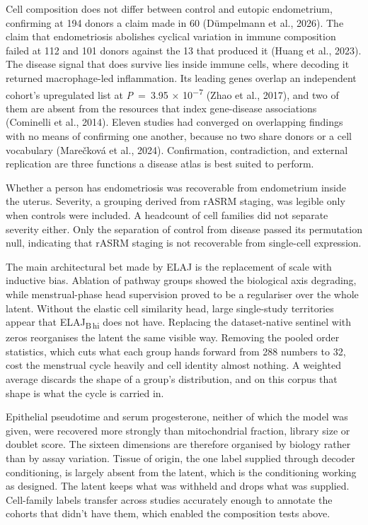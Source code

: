 \documentclass[11pt]{article}
\newcommand{\elaj}{ELAJ\xspace}
\begin{document}
Cell composition does not differ between control and eutopic endometrium,
confirming at 194 donors a claim made in 60
(Dümpelmann et al., 2026). The claim that endometriosis abolishes
cyclical variation in immune composition failed at 112 and 101 donors against
the 13 that produced it (Huang et al., 2023). The disease signal that does
survive lies inside immune cells, where decoding it returned macrophage-led
inflammation. Its leading genes overlap an independent cohort's upregulated
list at \textit{P}~=~3.95 × 10\textsuperscript{−7}
(Zhao et al., 2017), and two of them are absent from the resources
that index gene-disease associations (Cominelli et al., 2014). Eleven
studies had converged on overlapping findings with no means of confirming one
another, because no two share donors or a cell vocabulary
(Marečková et al., 2024). Confirmation, contradiction, and external
replication are three functions a disease atlas is best suited to perform.

Whether a person has endometriosis was recoverable from endometrium inside the
uterus. Severity, a grouping derived from rASRM staging, was legible only when
controls were included. A headcount of cell families did not separate severity
either. Only the separation of control from disease passed its permutation
null, indicating that rASRM staging is not recoverable from single-cell
expression.

The main architectural bet made by \elaj is the replacement of scale with
inductive bias. Ablation of pathway groups showed the biological axis
degrading, while menstrual-phase head supervision proved to be a regulariser
over the whole latent. Without the elastic cell similarity head, large
single-study territories appear that \elaj\textsubscript{B\,hi} does not
have. Replacing the dataset-native sentinel with zeros reorganises the latent
the same visible way. Removing the pooled order statistics,
which cuts what each group hands forward from 288 numbers to 32, cost the
menstrual cycle heavily and cell identity almost nothing. A weighted average
discards the shape of a group's distribution, and on this corpus that shape is
what the cycle is carried in.

Epithelial pseudotime and serum progesterone, neither of which the model was
given, were recovered more strongly than mitochondrial fraction, library size
or doublet score. The sixteen dimensions are therefore organised by biology
rather than by assay variation.
Tissue of origin, the one label supplied through decoder conditioning, is
largely absent from the latent, which is the conditioning working as designed.
The latent keeps what was withheld and drops what was supplied. Cell-family
labels transfer across studies accurately enough to annotate the cohorts that
didn't have them, which enabled the composition tests above.
\end{document}

